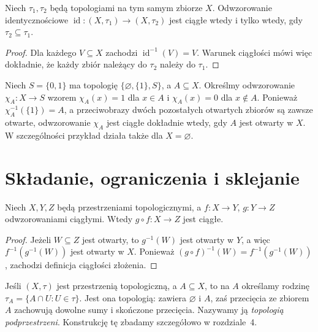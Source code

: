 \begin{stwierdzenie}
\label{prop:topog-porownanie-przez-ciaglosc}
Niech $\tau_1,\tau_2$ będą topologiami na tym samym zbiorze
$X$. Odwzorowanie identycznościowe
$\operatorname{id}\colon(X,\tau_1)\to(X,\tau_2)$
jest ciągłe wtedy i tylko wtedy, gdy $\tau_2\subseteq\tau_1$.
\end{stwierdzenie}
\begin{proof}
Dla każdego $V\subseteq X$ zachodzi
$\operatorname{id}^{-1}(V)=V$. Warunek ciągłości
mówi więc dokładnie, że każdy zbiór należący do
$\tau_2$ należy do $\tau_1$.
\end{proof}

\begin{przyklad}
\label{ex:topog-sierpinski-klasyfikator}
Niech $S=\{0,1\}$ ma topologię
$\{\varnothing,\{1\},S\}$, a $A\subseteq X$.
Określmy odwzorowanie $\chi_A\colon X\to S$ wzorem
$\chi_A(x)=1$ dla $x\in A$ i $\chi_A(x)=0$ dla $x\notin A$.
Ponieważ $\chi_A^{-1}(\{1\})=A$,
a przeciwobrazy dwóch pozostałych otwartych zbiorów
są zawsze otwarte, odwzorowanie $\chi_A$ jest ciągłe
dokładnie wtedy, gdy $A$ jest otwarty w $X$.
W szczególności przykład działa także dla $X=\varnothing$.
\end{przyklad}

\section{Składanie, ograniczenia i sklejanie}
\label{sec:topog-ciaglosc-konstrukcje}

\begin{twierdzenie}
\label{thm:topog-skladanie-ciaglych}
Niech $X,Y,Z$ będą przestrzeniami topologicznymi, a
$f\colon X\to Y$, $g\colon Y\to Z$ odwzorowaniami
ciągłymi. Wtedy $g\circ f\colon X\to Z$ jest ciągłe.
\end{twierdzenie}
\begin{proof}
Jeżeli $W\subseteq Z$ jest otwarty, to $g^{-1}(W)$
jest otwarty w $Y$, a więc $f^{-1}(g^{-1}(W))$
jest otwarty w $X$. Ponieważ
$(g\circ f)^{-1}(W)=f^{-1}(g^{-1}(W))$,
zachodzi definicja ciągłości złożenia.
\end{proof}

\begin{definicja}
\label{def:topog-topologia-podprzestrzeni-wstep}
Jeśli $(X,\tau)$ jest przestrzenią topologiczną,
a $A\subseteq X$, to na $A$ określamy rodzinę
$\tau_A=\{A\cap U:U\in\tau\}$. Jest ona topologią:
zawiera $\varnothing$ i $A$, zaś przecięcia ze zbiorem
$A$ zachowują dowolne sumy i skończone przecięcia.
Nazywamy ją \emph{topologią podprzestrzeni}.
Konstrukcję tę zbadamy szczegółowo w rozdziale~4.
\end{definicja}

